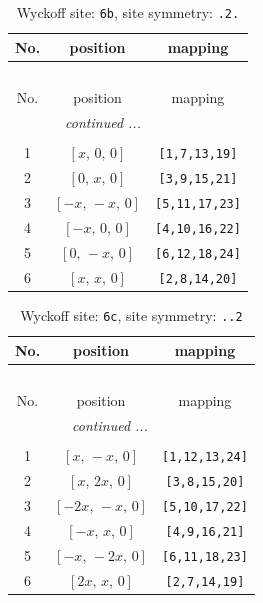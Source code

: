 \documentclass[fleqn,8pt]{jsarticle}
\begin{document}
\begin{longtable}{ccc}
\caption{Wyckoff site: {\tt 6b}, site symmetry: {\tt .2.}}
 \\
 \hline \hline
No. & position & mapping \\ \hline \endfirsthead

\multicolumn{2}{l}{\tablename\ \thetable{}} \\
 \hline \hline
No. & position & mapping \\ \hline \endhead

 \hline \hline
\multicolumn{2}{r}{\footnotesize\it continued ...} \\ \endfoot

 \hline \hline
\multicolumn{2}{r}{} \\ \endlastfoot

1 & $\left[ x,\, 0,\, 0 \right]$ & {\tt [1,7,13,19]} \\ \hline
2 & $\left[ 0,\, x,\, 0 \right]$ & {\tt [3,9,15,21]} \\ \hline
3 & $\left[ - x,\, - x,\, 0 \right]$ & {\tt [5,11,17,23]} \\ \hline
4 & $\left[ - x,\, 0,\, 0 \right]$ & {\tt [4,10,16,22]} \\ \hline
5 & $\left[ 0,\, - x,\, 0 \right]$ & {\tt [6,12,18,24]} \\ \hline
6 & $\left[ x,\, x,\, 0 \right]$ & {\tt [2,8,14,20]} \\
\end{longtable}
\renewcommand{\arraystretch}{1.2}
\begin{longtable}{ccc}
\caption{Wyckoff site: {\tt 6c}, site symmetry: {\tt ..2}}
 \\
 \hline \hline
No. & position & mapping \\ \hline \endfirsthead

\multicolumn{2}{l}{\tablename\ \thetable{}} \\
 \hline \hline
No. & position & mapping \\ \hline \endhead

 \hline \hline
\multicolumn{2}{r}{\footnotesize\it continued ...} \\ \endfoot

 \hline \hline
\multicolumn{2}{r}{} \\ \endlastfoot

1 & $\left[ x,\, - x,\, 0 \right]$ & {\tt [1,12,13,24]} \\ \hline
2 & $\left[ x,\, 2 x,\, 0 \right]$ & {\tt [3,8,15,20]} \\ \hline
3 & $\left[ - 2 x,\, - x,\, 0 \right]$ & {\tt [5,10,17,22]} \\ \hline
4 & $\left[ - x,\, x,\, 0 \right]$ & {\tt [4,9,16,21]} \\ \hline
5 & $\left[ - x,\, - 2 x,\, 0 \right]$ & {\tt [6,11,18,23]} \\ \hline
6 & $\left[ 2 x,\, x,\, 0 \right]$ & {\tt [2,7,14,19]} \\
\end{longtable}
\end{document}
